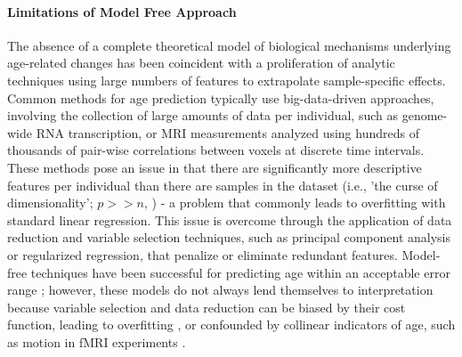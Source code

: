 \documentclass[utf8]{frontiersSCNS} %
\begin{document}
\paragraph{Limitations of Model Free Approach} 
The absence of a complete theoretical model of biological mechanisms underlying age-related changes has been coincident with a proliferation of analytic techniques using large numbers of features to extrapolate sample-specific effects. Common methods for age prediction typically use big-data-driven approaches, involving the collection of large amounts of data per individual, such as genome-wide RNA transcription, or MRI measurements analyzed using hundreds of thousands of pair-wise correlations between voxels at discrete time intervals. These methods pose an issue in that there are significantly more descriptive features per individual than there are samples in the dataset (i.e., 'the curse of dimensionality'; $p >> n$, \cite{taylor2019}) - a problem that commonly leads to overfitting with standard linear regression. This issue is overcome through the application of data reduction and variable selection techniques, such as principal component analysis or regularized regression, that penalize or eliminate redundant features. Model-free techniques have been successful for predicting age within an acceptable error range \citep{cole2017predicting}; however, these models do not always lend themselves to interpretation because variable selection and data reduction can be biased by their cost function, leading to overfitting \citep{babyak2004you}, or confounded by collinear indicators of age, such as motion in fMRI experiments \citep{satterthwaite2013heterogeneous}.
%
\vspace{5pt}
%
\end{document}
